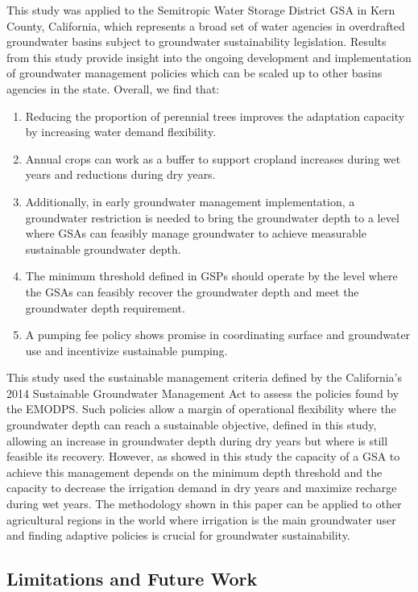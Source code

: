 \documentclass[a4paper,fleqn]{cas-sc}
\begin{document}
This study was applied to the Semitropic Water Storage District GSA in Kern County, California, which represents a broad set of water agencies in overdrafted groundwater basins subject to groundwater sustainability legislation. Results from this study provide insight into the ongoing development and implementation of groundwater management policies which can be scaled up to other basins agencies in the state. Overall, we find that:  

\begin{enumerate}
    \item   Reducing the proportion of perennial trees improves the adaptation capacity by increasing water demand flexibility.  
    \item  Annual crops can work as a buffer to support cropland increases during wet years and reductions during dry years.
    \item  Additionally, in early groundwater management implementation, a groundwater restriction is needed to bring the groundwater depth to a level where GSAs can feasibly manage groundwater to achieve measurable sustainable groundwater depth.
    \item The minimum threshold defined in GSPs should operate by the level where the GSAs can feasibly recover the groundwater depth and meet the groundwater depth requirement.
    \item  A pumping fee policy shows promise in coordinating surface and groundwater use and incentivize sustainable pumping. 
\end{enumerate}

This study used the sustainable management criteria defined by the California’s 2014 Sustainable Groundwater Management Act to assess the policies found by the EMODPS. Such policies allow a margin of operational flexibility where the groundwater depth can reach a sustainable objective, defined in this study, allowing an increase in groundwater depth during dry years but where is still feasible its recovery. However, as showed in this  study the capacity of a GSA to achieve this management depends on the minimum depth threshold and the capacity to decrease the irrigation demand in dry years and maximize recharge during wet years. The methodology shown in this paper can be applied to other agricultural regions in the world where irrigation is the main groundwater user and finding adaptive policies is crucial for groundwater sustainability. 

\subsection{Limitations and Future Work}
\end{document}
